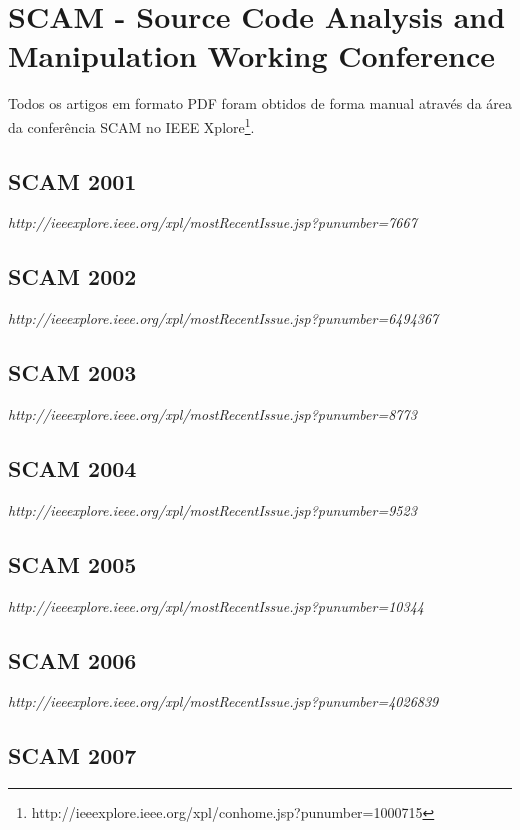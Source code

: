 \section{SCAM - Source Code Analysis and Manipulation Working Conference}

Todos os artigos em formato PDF foram obtidos de forma manual através da área
da conferência SCAM no IEEE
Xplore\footnote{http://ieeexplore.ieee.org/xpl/conhome.jsp?punumber=1000715}.

\subsection{SCAM 2001}

{\small \em http://ieeexplore.ieee.org/xpl/mostRecentIssue.jsp?punumber=7667}


\subsection{SCAM 2002}

{\small \em http://ieeexplore.ieee.org/xpl/mostRecentIssue.jsp?punumber=6494367}


\subsection{SCAM 2003}

{\small \em http://ieeexplore.ieee.org/xpl/mostRecentIssue.jsp?punumber=8773}

\subsection{SCAM 2004}

{\small \em http://ieeexplore.ieee.org/xpl/mostRecentIssue.jsp?punumber=9523}

\subsection{SCAM 2005}

{\small \em http://ieeexplore.ieee.org/xpl/mostRecentIssue.jsp?punumber=10344}

\subsection{SCAM 2006}

{\small \em http://ieeexplore.ieee.org/xpl/mostRecentIssue.jsp?punumber=4026839}


\subsection{SCAM 2007}

